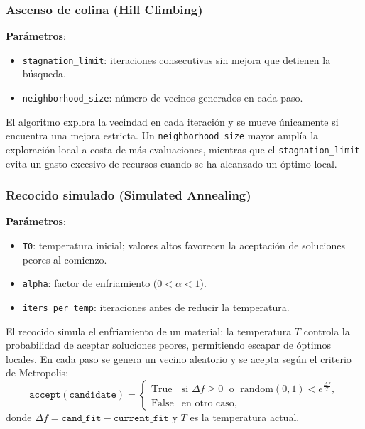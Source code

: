 \documentclass[letterpaper, 12pt]{report}
\begin{document}
\subsubsection{Ascenso de colina (Hill Climbing)}

\textbf{Parámetros}: 
\begin{itemize}
    \item \texttt{stagnation\_limit}: iteraciones consecutivas sin mejora que detienen la búsqueda.
    \item \texttt{neighborhood\_size}: número de vecinos generados en cada paso.
\end{itemize}

El algoritmo explora la vecindad en cada iteración y se mueve únicamente si encuentra una mejora estricta. Un \texttt{neighborhood\_size} mayor amplía la exploración local a costa de más evaluaciones, mientras que el \texttt{stagnation\_limit} evita un gasto excesivo de recursos cuando se ha alcanzado un óptimo local.


\subsubsection{Recocido simulado (Simulated Annealing)}

\textbf{Parámetros}:
\begin{itemize}
    \item \texttt{T0}: temperatura inicial; valores altos favorecen la aceptación de soluciones peores al comienzo.
    \item \texttt{alpha}: factor de enfriamiento (\(0 < \alpha < 1\)).
    \item \texttt{iters\_per\_temp}: iteraciones antes de reducir la temperatura.
\end{itemize}

El recocido simula el enfriamiento de un material; la temperatura
\(T\) controla la probabilidad de aceptar soluciones peores, 
permitiendo escapar de óptimos locales. En cada paso se genera 
un vecino aleatorio y se acepta según el criterio de Metropolis:
\[
    \texttt{accept}(\texttt{candidate}) = 
\begin{cases}
    \text{True} & \text{si } \Delta f \ge 0 \;\text{ \ o \ }\; \text{random}(0,1) < e^{\displaystyle\frac{\Delta f}{T}},\\[4pt]
    \text{False} & \text{en otro caso},
\end{cases}
    \]
    donde \(\Delta f = \texttt{cand\_fit} - \texttt{current\_fit}\) y \(T\) es la temperatura actual. \\
\end{document}
